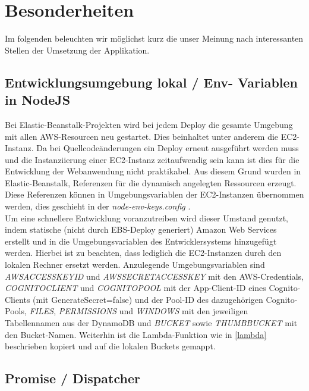 \documentclass[a4paper, 12pt]{scrreprt}
\renewcommand\_{\textunderscore\allowbreak}
\begin{document}
\chapter{Besonderheiten}
Im folgenden beleuchten wir möglichst kurz die unser Meinung nach interessanten Stellen der Umsetzung der Applikation.

\section{Entwicklungsumgebung lokal / Env- Variablen in NodeJS}

Bei Elastic-Beanstalk-Projekten wird bei jedem Deploy die gesamte Umgebung mit allen AWS-Resourcen neu gestartet. Dies beinhaltet unter anderem die EC2-Instanz. Da bei Quellcodeänderungen ein Deploy erneut ausgeführt werden muss und die Instanziierung einer EC2-Instanz zeitaufwendig sein kann ist dies für die Entwicklung der Webanwendung nicht praktikabel. Aus diesem Grund wurden in Elastic-Beanstalk, Referenzen \cite{AWSDc} für die dynamisch angelegten Ressourcen erzeugt. Diese Referenzen können in Umgebungsvariablen der EC2-Instanzen übernommen werden, dies geschieht in der \textit{node-env-keys.config} \cite{AWSDd}.\\[0.5cm]
Um eine schnellere Entwicklung voranzutreiben wird dieser Umstand genutzt, indem statische (nicht durch EBS-Deploy generiert) Amazon Web Services erstellt und in die Umgebungsvariablen des Entwicklersystems hinzugefügt werden.
Hierbei ist zu beachten, dass lediglich die EC2-Instanzen durch den lokalen Rechner ersetzt werden. Anzulegende Umgebungsvariablen sind
\textit{AWS\_ACCESS\_KEY\_ID} und \textit{AWS\_SECRET\_ACCESS\_KEY} mit den AWS-Credentials, \textit{COGNITO\_CLIENT} und \textit{COGNITO\_POOL} mit der App-Client-ID eines Cognito-Clients (mit GenerateSecret=false) und der Pool-ID des dazugehörigen Cognito-Pools, \textit{FILES}, \textit{PERMISSIONS} und \textit{WINDOWS} mit den jeweiligen Tabellennamen aus der DynamoDB und \textit{BUCKET} sowie \textit{THUMB\_BUCKET} mit den Bucket-Namen. Weiterhin ist die Lambda-Funktion wie in \ref{lambda} beschrieben kopiert und auf die lokalen Buckets gemappt.  





\section{Promise / Dispatcher}
\label{dispatcher}
\end{document}
